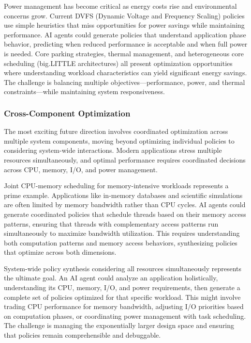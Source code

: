 Power management has become critical as energy costs rise and environmental concerns grow. Current DVFS (Dynamic Voltage and Frequency Scaling) policies use simple heuristics that miss opportunities for power savings while maintaining performance. AI agents could generate policies that understand application phase behavior, predicting when reduced performance is acceptable and when full power is needed. Core parking strategies, thermal management, and heterogeneous core scheduling (big.LITTLE architectures) all present optimization opportunities where understanding workload characteristics can yield significant energy savings. The challenge is balancing multiple objectives—performance, power, and thermal constraints—while maintaining system responsiveness.

\subsubsection{Cross-Component Optimization}
The most exciting future direction involves coordinated optimization across multiple system components, moving beyond optimizing individual policies to considering system-wide interactions. Modern applications stress multiple resources simultaneously, and optimal performance requires coordinated decisions across CPU, memory, I/O, and power management.

Joint CPU-memory scheduling for memory-intensive workloads represents a prime example. Applications like in-memory databases and scientific simulations are often limited by memory bandwidth rather than CPU cycles. AI agents could generate coordinated policies that schedule threads based on their memory access patterns, ensuring that threads with complementary access patterns run simultaneously to maximize bandwidth utilization. This requires understanding both computation patterns and memory access behaviors, synthesizing policies that optimize across both dimensions.

System-wide policy synthesis considering all resources simultaneously represents the ultimate goal. An AI agent could analyze an application holistically, understanding its CPU, memory, I/O, and power requirements, then generate a complete set of policies optimized for that specific workload. This might involve trading CPU performance for memory bandwidth, adjusting I/O priorities based on computation phases, or coordinating power management with task scheduling. The challenge is managing the exponentially larger design space and ensuring that policies remain comprehensible and debuggable.

